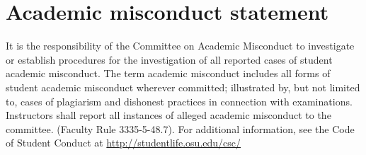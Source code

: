 \documentclass{ximera}
\begin{document}
\section*{Academic misconduct statement}
It is the responsibility of the Committee on Academic Misconduct to investigate or establish procedures for the investigation of all reported cases of student academic misconduct. The term academic misconduct includes all forms of student academic misconduct wherever committed; illustrated by, but not limited to, cases of plagiarism and dishonest practices in connection with examinations. Instructors shall report all instances of alleged academic misconduct to the committee. (Faculty Rule 3335-5-48.7). For additional information, see the Code of Student Conduct at \href{http://studentlife.osu.edu/csc/}{http://studentlife.osu.edu/csc/}
\end{document}
